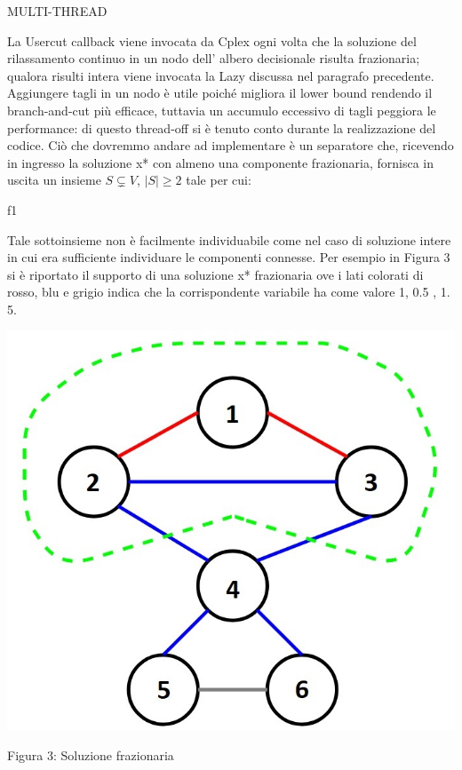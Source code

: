 \documentclass[11pt]{article}
\begin{document}
\vspace{2\baselineskip}
MULTI-THREAD
\vspace{2\baselineskip}

La Usercut callback viene invocata da Cplex ogni volta che la soluzione del rilassamento continuo in un nodo dell' albero decisionale risulta frazionaria; qualora risulti intera viene invocata la Lazy discussa nel paragrafo precedente.  Aggiungere tagli  in un nodo è utile poiché migliora il lower bound rendendo il branch-and-cut più efficace, tuttavia un accumulo eccessivo di tagli peggiora le performance: di questo thread-off si è tenuto conto durante la realizzazione del codice.  
Ciò che dovremmo andare ad implementare è un separatore che, ricevendo in ingresso la soluzione x* con almeno una componente frazionaria, fornisca in uscita un insieme $S\subsetneq{V}$, $|S|\geq{2}$ tale per cui:

f1


Tale sottoinsieme non è facilmente individuabile come nel caso di soluzione intere in cui era sufficiente individuare le componenti connesse. Per esempio in Figura 3 si è riportato il supporto di una soluzione x* frazionaria ove i lati colorati di rosso, blu e grigio indica che la corrispondente variabile ha come valore 1, 0.5 , 1. 5.

\begin{center}
\includegraphics[scale=0.5]{SoluzioneFrazionaria}  

Figura 3: Soluzione frazionaria
\end{center}
\end{document}
